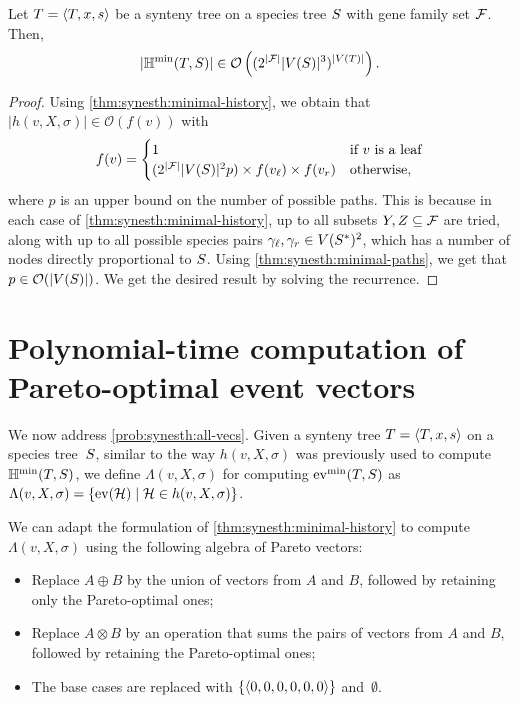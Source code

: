 \begin{theorem}\label{thm:synesth:number-min-hist}
    Let \(T = \left\langle T, x, s\right\rangle\) be a synteny tree on a species tree \(S\) with gene family set \(\mathcal{F}\).
    Then, \[
        |\mathbb{H}^{\mathrm{min}}(T, S)| \in
            \mathcal{O}\left(
                (2^{|\mathcal{F}|}|V(S)|^3)^{|V(T)|}
            \right).
    \]
\end{theorem}
\begin{proof}
    Using \cref{thm:synesth:minimal-history}, we obtain that \(|h(v, X, \sigma)| \in \mathcal{O}(f(v))\) with \[
        f(v) = \begin{cases}
            1 & \text{if } v \text{ is a leaf} \\
            (2^{|\mathcal{F}|} |V(S)|^2 p) \times f(v_\mathit{\ell}) \times f(v_r) & \text{otherwise},
        \end{cases}
    \]
    where \(p\) is an upper bound on the number of possible paths.
    This is because in each case of \cref{thm:synesth:minimal-history}, up to all subsets \(Y, Z \subseteq \mathcal{F}\) are tried, along with up to all possible species pairs \(\gamma_\mathit{\ell}, \gamma_r \in V(S^*)^2\), which has a number of nodes directly proportional to \(S\).
    Using \cref{thm:synesth:minimal-paths}, we get that \(p \in \mathcal{O}(|V(S)|)\).
    We get the desired result by solving the recurrence.
\end{proof}

\section{Polynomial-time computation of Pareto-optimal event vectors}\label{sec:synesth:pareto-vectors}

We now address \cref{prob:synesth:all-vecs}.
Given a synteny tree \(T = \left\langle T, x, s\right\rangle\) on a species tree~\(S\),
similar to the way \(h(v, X, \sigma)\) was previously used to compute \(\mathbb{H}^{\mathrm{min}}(T, S)\), we define \(\Lambda(v, X, \sigma)\) for computing \(\mathrm{ev}^{\mathrm{min}}(T, S)\)
as \(\Lambda(v, X, \sigma) = \{\mathrm{ev}(\mathcal{H}) \mid \mathcal{H} \in h(v, X, \sigma)\}\).

We can adapt the formulation of \cref{thm:synesth:minimal-history} to compute \(\Lambda(v, X, \sigma)\) using the following algebra of Pareto vectors: \begin{itemize}
    \item Replace \(A \oplus B\) by the union of vectors from \(A\) and \(B\), followed by retaining only the Pareto-optimal ones;
    \item Replace \(A \otimes B\) by an operation that sums the pairs of vectors from \(A\) and \(B\), followed by retaining the Pareto-optimal ones;
    \item The base cases are replaced with \(\{\left\langle0, 0, 0, 0, 0, 0\right\rangle\}\) and~\(\emptyset\).
\end{itemize}

